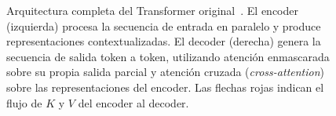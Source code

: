 \begin{figure}[H]
\caption{Arquitectura completa del Transformer original~\cite{vaswani2017attention}.
El encoder (izquierda) procesa la secuencia de entrada en paralelo y produce
representaciones contextualizadas. El decoder (derecha) genera la secuencia
de salida token a token, utilizando atenci\'on enmascarada sobre su propia
salida parcial y atenci\'on cruzada (\textit{cross-attention}) sobre las
representaciones del encoder. Las flechas rojas indican el flujo de $K$ y $V$
del encoder al decoder.}
\label{fig:transformer_completo}
\end{figure}

